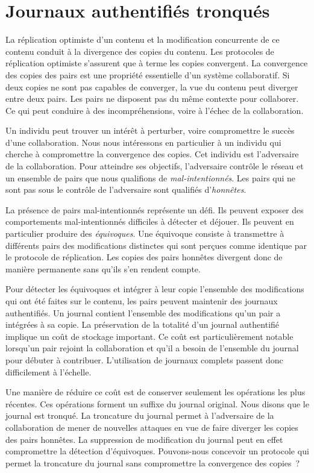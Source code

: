 
\chapter{Journaux authentifiés tronqués}\label{ch:pruned-log}

\minitoc{}
\bigskip


La réplication optimiste d'un contenu et la modification concurrente de ce contenu conduit à la divergence des copies du contenu.
Les protocoles de réplication optimiste s'assurent que à terme les copies convergent.
La convergence des copies des pairs est une propriété essentielle d'un système collaboratif.
Si deux copies ne sont pas capables de converger, la vue du contenu peut diverger entre deux pairs.
Les pairs ne disposent pas du même contexte pour collaborer.
Ce qui peut conduire à des incompréhensions, voire à l'échec de la collaboration.

Un individu peut trouver un intérêt à perturber, voire compromettre le succès d'une collaboration.
Nous nous intéressons en particulier à un individu qui cherche à compromettre la convergence des copies.
Cet individu est l'adversaire de la collaboration.
Pour atteindre ses objectifs, l'adversaire contrôle le réseau et un ensemble de pairs que nous qualifions de \emph{mal-intentionnés}.
Les pairs qui ne sont pas sous le contrôle de l'adversaire sont qualifiés d'\emph{honnêtes}.

La présence de pairs mal-intentionnés représente un défi.
Ils peuvent exposer des comportements mal-intentionnés difficiles à détecter et déjouer.
Ils peuvent en particulier produire des \emph{équivoques}.
Une équivoque consiste à transmettre à différents pairs des modifications distinctes qui sont perçues comme identique par le protocole de réplication.
Les copies des pairs honnêtes divergent donc de manière permanente sans qu'ils s'en rendent compte.

Pour détecter les équivoques et intégrer à leur copie l'ensemble des modifications qui ont été faites sur le contenu, les pairs peuvent maintenir des journaux authentifiés.
Un journal contient l'ensemble des modifications qu'un pair a intégrées à sa copie.
La préservation de la totalité d'un journal authentifié implique un coût de stockage important.
Ce coût est particulièrement notable lorsqu'un pair rejoint la collaboration et qu'il a besoin de l'ensemble du journal pour débuter à contribuer.
L'utilisation de journaux complets passent donc difficilement à l'échelle.

Une manière de réduire ce coût est de conserver seulement les opérations les plus récentes.
Ces opérations forment un suffixe du journal original.
Nous disons que le journal est tronqué.
La troncature du journal permet à l'adversaire de la collaboration de mener de nouvelles attaques en vue de faire diverger les copies des pairs honnêtes.
La suppression de modification du journal peut en effet compromettre la détection d'équivoques.
Pouvons-nous concevoir un protocole qui permet la troncature du journal sans compromettre la convergence des copies~?

